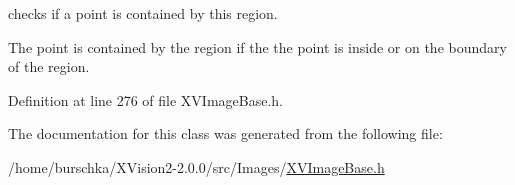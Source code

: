 checks if a point is contained by this region.

The point is contained by the region if the  the point is inside or on the boundary of the  region. 

Definition at line 276 of file XVImage\-Base.h.

The documentation for this class was generated from the following file:\begin{CompactItemize}
\item 
/home/burschka/XVision2-2.0.0/src/Images/\hyperlink{XVImageBase.h-source}{XVImage\-Base.h}\end{CompactItemize}
